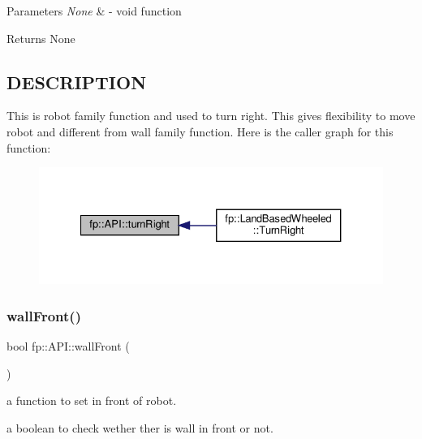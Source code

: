 \begin{DoxyParams}{Parameters}
{\em None} & -\/ void function \\
\hline
\end{DoxyParams}
\begin{DoxyReturn}{Returns}
None 
\end{DoxyReturn}
\hypertarget{_m_a_z_e_8h_DESCRIPTION}{}\subsection{D\+E\+S\+C\+R\+I\+P\+T\+I\+ON}\label{_m_a_z_e_8h_DESCRIPTION}
This is robot family function and used to turn right. This gives flexibility to move robot and different from wall family function. Here is the caller graph for this function\+:
\nopagebreak
\begin{figure}[H]
\begin{center}
\leavevmode
\includegraphics[width=327pt]{classfp_1_1_a_p_i_ac346f1c3ae7a39829c16681be2f25e92_icgraph}
\end{center}
\end{figure}
\mbox{\label{classfp_1_1_a_p_i_a52c23ca6b94cd561727e63c4a568bb86}} 
\subsubsection{\texorpdfstring{wall\+Front()}{wallFront()}}
{\footnotesize\ttfamily bool fp\+::\+A\+P\+I\+::wall\+Front (\begin{DoxyParamCaption}{ }\end{DoxyParamCaption})\hspace{0.3cm}{\ttfamily [static]}}



a function to set in front of robot. 

a boolean to check wether ther is wall in front or not.


